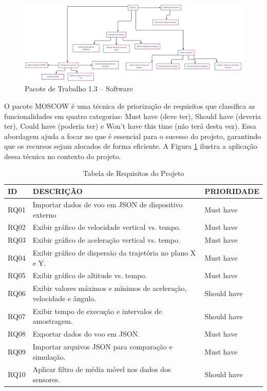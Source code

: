 \begin{figure}[!h]
	\centering
\includegraphics[width=15cm]{figuras/eap_software.png}
	\caption{Pacote de Trabalho 1.3 – Software}
	\label{fig_eap_software} 
\end{figure}


\begin{samepage}
O pacote MOSCOW é uma técnica de priorização de requisitos que classifica as funcionalidades em quatro categorias: Must have (deve ter), Should have (deveria ter), Could have (poderia ter) e Won't have this time (não terá desta vez). Essa abordagem ajuda a focar no que é essencial para o sucesso do projeto, garantindo que os recursos sejam alocados de forma eficiente. A Figura \ref{tab:requisitos_projeto} ilustra a aplicação dessa técnica no contexto do projeto.

\begin{table}[htpb]
\centering
\scriptsize
\setlength{\tabcolsep}{4pt}
\caption{Tabela de Requisitos do Projeto}
\begin{tabular}{|l|p{8cm}|l|}
\hline
\textbf{ID} & \textbf{DESCRIÇÃO} & \textbf{PRIORIDADE} \\
\hline
RQ01 & Importar dados de voo em JSON de dispositivo externo & Must have \\
\hline
RQ02 & Exibir gráfico de velocidade vertical vs. tempo. & Must have \\
\hline
RQ03 & Exibir gráfico de aceleração vertical vs. tempo. & Must have \\
\hline
RQ04 & Exibir gráfico de dispersão da trajetória no plano X e Y. & Must have \\
\hline
RQ05 & Exibir gráfico de altitude vs. tempo. & Must have \\
\hline
RQ06 & Exibir valores máximos e mínimos de aceleração, velocidade e ângulo. & Should have \\
\hline
RQ07 & Exibir tempo de execução e intervalos de amostragem. & Should have \\
\hline
RQ08 & Exportar dados do voo em JSON. & Must have \\
\hline
RQ09 & Importar arquivos JSON para comparação e simulação. & Must have \\
\hline
RQ10 & Aplicar filtro de média móvel nos dados dos sensores. & Should have \\
\hline
\end{tabular}
\label{tab:requisitos_projeto}
\end{table}

\end{samepage}


